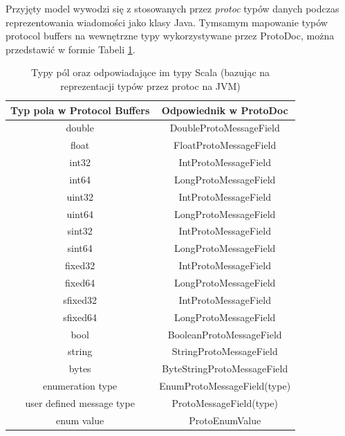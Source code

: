 \documentclass[pdflatex,11pt]{aghdpl}
\begin{document}
Przyjęty model wywodzi się z stosowanych przez \textit{protoc}
typów danych podczas reprezentowania wiadomości jako klasy Java. Tymsamym mapowanie typów protocol buffers na wewnętrzne typy wykorzystywane 
przez ProtoDoc, można przedstawić w formie Tabeli \ref{tab:field_types}.

\begin{table}
 \begin{center}
\begin{tabular}[c]{|c|c|}
\hline 
Typ pola w Protocol Buffers & Odpowiednik w ProtoDoc\\ \hline

double   & DoubleProtoMessageField \\ \hline
float    & FloatProtoMessageField \\ \hline
int32    & IntProtoMessageField \\ \hline
int64    & LongProtoMessageField \\ \hline 
uint32   & IntProtoMessageField \\ \hline 
uint64   & LongProtoMessageField \\ \hline 
sint32   & IntProtoMessageField \\ \hline 
sint64   & LongProtoMessageField \\ \hline 
fixed32  & IntProtoMessageField \\ \hline 
fixed64  & LongProtoMessageField \\ \hline 
sfixed32 & IntProtoMessageField \\ \hline 
sfixed64 & LongProtoMessageField \\ \hline 
bool     & BooleanProtoMessageField \\ \hline
string   & StringProtoMessageField \\ \hline 
bytes    & ByteStringProtoMessageField \\ \hline \hline 
enumeration type & EnumProtoMessageField(type) \\ \hline
user defined message type & ProtoMessageField(type) \\ \hline \hline 
enum value & ProtoEnumValue \\ \hline
 \end{tabular}
 \end{center}
\label{tab:field_types}
\caption{Typy pól oraz odpowiadające im typy Scala \small{(bazując na reprezentacji typów przez protoc na JVM)}}
\end{table}


\end{document}

